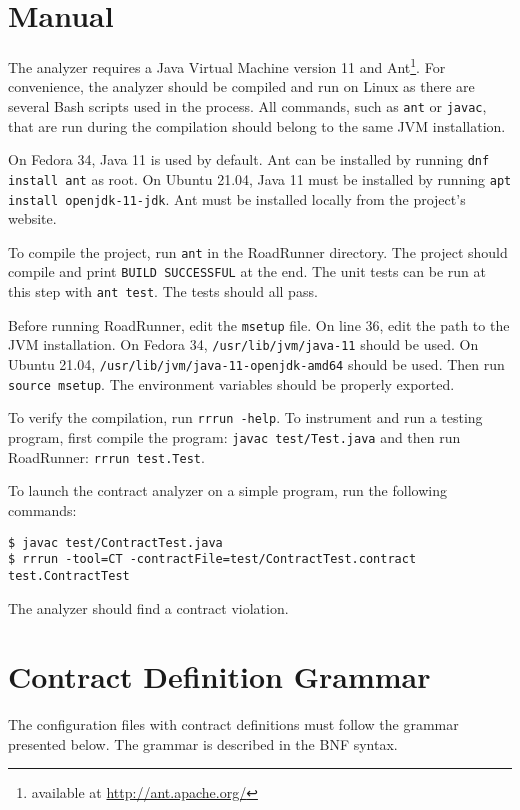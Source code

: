 \chapter{Manual}
\label{manual}

The analyzer requires a Java Virtual Machine version 11 and
Ant\footnote{available at \url{http://ant.apache.org/}}. For
convenience, the analyzer should be compiled and run on Linux as there are
several Bash scripts used in the process. All commands, such as \texttt{ant} or
\texttt{javac}, that are run during the compilation should belong to the same
JVM installation.

On Fedora 34, Java 11 is used by default. Ant can be installed by running
\texttt{dnf install ant} as root. On Ubuntu 21.04, Java 11 must be installed by
running \texttt{apt install openjdk-11-jdk}. Ant must be installed locally from
the project's website.

To compile the project, run \texttt{ant} in the RoadRunner directory. The
project should compile and print \texttt{BUILD SUCCESSFUL} at the end. The unit
tests can be run at this step with \texttt{ant test}. The tests should all pass.

Before running RoadRunner, edit the \texttt{msetup} file. On line 36, edit the
path to the JVM installation. On Fedora 34, \texttt{/usr/lib/jvm/java-11} should
be used. On Ubuntu 21.04, \texttt{/usr/lib/jvm/java-11-openjdk-amd64} should be
used. Then run \texttt{source msetup}. The environment variables should be
properly exported.

To verify the compilation, run \texttt{rrrun -help}. To instrument and run a
testing program, first compile the program: \texttt{javac test/Test.java} and
then run RoadRunner: \texttt{rrrun test.Test}.

To launch the contract analyzer on a simple program, run the following commands:
\begin{lstlisting}
$ javac test/ContractTest.java
$ rrrun -tool=CT -contractFile=test/ContractTest.contract test.ContractTest
\end{lstlisting}
The analyzer should find a contract violation.

\chapter{Contract Definition Grammar}
\label{appGrammar}

The configuration files with contract definitions must follow the grammar
presented below. The grammar is described in the BNF syntax.

